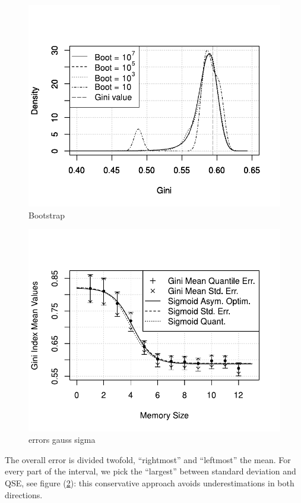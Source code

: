 \begin{figure}[htpb]
  \centering
  \includegraphics[width=.8\columnwidth]{img/bootstrap.pdf}
  \caption{Bootstrap}
  \label{fig:bootstrap}
\end{figure}
\begin{figure}[htpb]
  \centering
  \includegraphics[width=.8\columnwidth]{img/appendix.pdf}
  \caption{errors gauss sigma}
  \label{fig:gausssigma}
\end{figure}
The overall error is divided twofold, ``rightmost'' and ``leftmost''
the mean. For every part of the interval, we pick the ``largest''
between standard deviation and QSE, see figure (\ref{fig:gausssigma}): this conservative approach avoids
underestimations in both directions.

